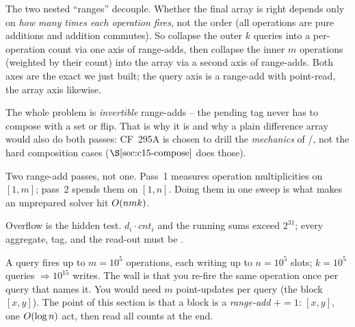 The two nested ``ranges'' decouple.  Whether the final array is right depends only on \emph{how many times each operation fires}, not the order (all operations are pure additions and addition commutes).  So collapse the outer \(k\) queries into a per-operation count via one axis of range-adds, then collapse the inner \(m\) operations (weighted by their count) into the array via a second axis of range-adds.  Both axes are the exact  we just built; the query axis is a range-add with point-read, the array axis likewise.

\begin{observation}
The whole problem is \emph{invertible} range-adds -- the pending tag never has to compose with a set or flip.  That is why it is  and why a plain difference array would also do both passes: CF~295A is chosen to drill the \emph{mechanics} of /, not the hard composition cases (\(\secref{c15-compose}\) does those).
\end{observation}
\begin{observation}
Two range-add passes, not one.  Pass~1 measures operation multiplicities on \([1,m]\); pass~2 spends them on \([1,n]\).  Doing them in one sweep is what makes an unprepared solver hit \(O(nmk)\).
\end{observation}
\begin{observation}
Overflow is the hidden test.  \(d_i\cdot\mathit{cnt}_i\) and the running sums exceed \(2^{31}\); every aggregate, tag, and the read-out must be .
\end{observation}

\begin{thinkbox}
{A query fires up to \(m=10^5\) operations, each writing up to \(n=10^5\) slots; \(k=10^5\) queries \(\Rightarrow 10^{15}\) writes.  The wall is that you re-fire the same operation once per query that names it.}
{You would need \(m\) point-updates per query (the block \([x,y]\)).  The point of this section is that a block is a \emph{range-add} \(\mathrel{+}=1\):  \([x,y]\), one \(O(\log n)\) act, then read all counts at the end.}
\end{thinkbox}

